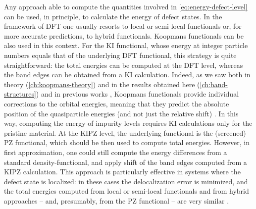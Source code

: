 Any approach able to compute the quantities involved in \cref{eq:energy-defect-level} can be used, in principle, to calculate the energy of defect states. In the framework of DFT one usually resorts to local or semi-local functionals or, for more accurate predictions, to hybrid functionals. Koopmans functionals can be also used in this context. For the KI functional, whose energy at integer particle numbers equals that of the underlying DFT functional, this strategy is quite straightforward: the total energies can be computed at the DFT level, whereas the band edges can be obtained from a KI calculation. Indeed, as we saw both in theory (\cref{ch:koopmans-theory}) and in the results obtained here (\cref{ch:band-structures}) and in previous works \cite{nguyen_koopmans-compliant_2018,colonna_koopmans-compliant_2019}, Koopmans functionals provide individual corrections to the orbital energies, meaning that they predict the absolute position of the quasiparticle energies (and not just the relative shift) \cite{}. In this way, computing the energy of impurity levels requires KI calculations only for the pristine material. At the KIPZ level, the underlying functional is the (screened) PZ functional, which should be then used to compute total energies. However, in first approximation, one could still compute the energy differences from a standard density-functional, and apply shift of the band edges computed from a KIPZ calculation. This approach is particularly effective in systems where the defect state is localized: in these cases the delocalization error is minimized, and the total energies computed from local or semi-local functionals and from hybrid approaches -- and, presumably, from the PZ functional -- are very similar \cite{komsa_assessing_2011}.

